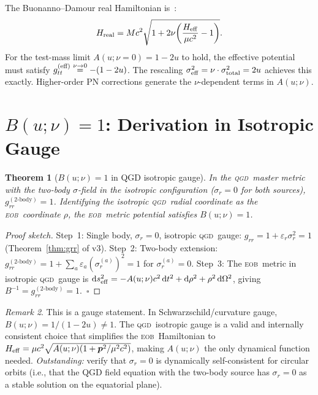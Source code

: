 \documentclass[11pt,a4paper]{article}
\theoremstyle{plain}
\newtheorem{theorem}{Theorem}[section]
\theoremstyle{remark}
\newtheorem{remark}[theorem]{Remark}
\newcommand{\QGD}{\textsc{qgd}}
\newcommand{\EOB}{\textsc{eob}}
\begin{document}
The Buonanno--Damour real Hamiltonian is~\cite{Buonanno1999}:
\begin{equation}
  H_{\rm real} = Mc^2\sqrt{1+2\nu\!\left(\frac{H_{\rm eff}}{\mu c^2}-1\right)}.
\end{equation}
For the test-mass limit $A(u;\nu=0)=1-2u$ to hold, the effective potential must satisfy
$g_{tt}^{\rm(eff)} \stackrel{\nu\to0}{=}-(1-2u)$.
The rescaling $\sigma_{\rm eff}^2 = \nu\cdot\sigma_{\rm total}^2 = 2u$ achieves this exactly.
Higher-order PN corrections generate the $\nu$-dependent terms in $A(u;\nu)$.

\section{$B(u;\nu)=1$: Derivation in Isotropic Gauge}

\begin{theorem}[$B(u;\nu)=1$ in QGD isotropic gauge]
\label{thm:B1}
In the \QGD\ master metric with the two-body $\sigma$-field in the isotropic
configuration ($\sigma_r=0$ for both sources), $g_{rr}^{(2\text{-body})}=1$.
Identifying the isotropic \QGD\ radial coordinate as the \EOB\ coordinate
$\rho$, the \EOB\ metric potential satisfies $B(u;\nu)=1$.
\end{theorem}

\begin{proof}[Proof sketch]
Step~1: Single body, $\sigma_r=0$, isotropic \QGD\ gauge:
$g_{rr} = 1+\varepsilon_r\sigma_r^2 = 1$ (Theorem~\ref{thm:grr} of v3).
Step~2: Two-body extension: $g_{rr}^{(2\text{-body})} = 1 + \sum_a\varepsilon_a(\sigma_r^{(a)})^2 = 1$
for $\sigma_r^{(a)}=0$.
Step~3: The \EOB\ metric in isotropic \QGD\ gauge is
$\mathrm{d}s^2_{\rm eff} = -A(u;\nu)c^2\,\mathrm{d}t^2 + \mathrm{d}\rho^2 + \rho^2\,\mathrm{d}\Omega^2$,
giving $B^{-1}=g_{rr}^{(2\text{-body})}=1$.~$\square$
\end{proof}

\begin{remark}
This is a gauge statement. In Schwarzschild/curvature gauge, $B(u;\nu)=1/(1-2u)\neq1$.
The \QGD\ isotropic gauge is a valid and internally consistent choice that
simplifies the \EOB\ Hamiltonian to
$H_{\rm eff} = \mu c^2\sqrt{A(u;\nu)(1+\bm{p}^2/\mu^2c^2)}$,
making $A(u;\nu)$ the only dynamical function needed.
\emph{Outstanding:} verify that $\sigma_r=0$ is dynamically self-consistent
for circular orbits (i.e., that the QGD field equation with the two-body source
has $\sigma_r=0$ as a stable solution on the equatorial plane).
\end{remark}
\end{document}
